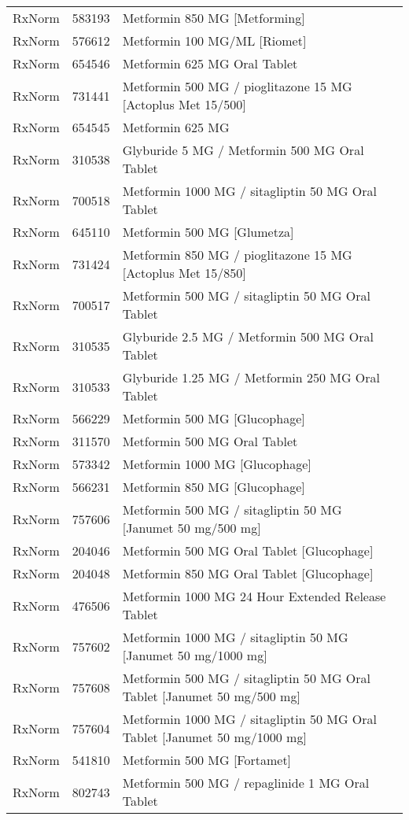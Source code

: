 \begin{longtable}{p{}p{}p{}}
  RxNorm & 583193 & Metformin 850 MG [Metforming] \\ 
  RxNorm & 576612 & Metformin 100 MG/ML [Riomet] \\ 
  RxNorm & 654546 & Metformin 625 MG Oral Tablet \\ 
  RxNorm & 731441 & Metformin 500 MG / pioglitazone 15 MG [Actoplus Met 15/500] \\ 
  RxNorm & 654545 & Metformin 625 MG \\ 
  RxNorm & 310538 & Glyburide 5 MG / Metformin 500 MG Oral Tablet \\ 
  RxNorm & 700518 & Metformin 1000 MG / sitagliptin 50 MG Oral Tablet \\ 
  RxNorm & 645110 & Metformin 500 MG [Glumetza] \\ 
  RxNorm & 731424 & Metformin 850 MG / pioglitazone 15 MG [Actoplus Met 15/850] \\ 
  RxNorm & 700517 & Metformin 500 MG / sitagliptin 50 MG Oral Tablet \\ 
  RxNorm & 310535 & Glyburide 2.5 MG / Metformin 500 MG Oral Tablet \\ 
  RxNorm & 310533 & Glyburide 1.25 MG / Metformin 250 MG Oral Tablet \\ 
  RxNorm & 566229 & Metformin 500 MG [Glucophage] \\ 
  RxNorm & 311570 & Metformin 500 MG Oral Tablet \\ 
  RxNorm & 573342 & Metformin 1000 MG [Glucophage] \\ 
  RxNorm & 566231 & Metformin 850 MG [Glucophage] \\ 
  RxNorm & 757606 & Metformin 500 MG / sitagliptin 50 MG [Janumet 50 mg/500 mg] \\ 
  RxNorm & 204046 & Metformin 500 MG Oral Tablet [Glucophage] \\ 
  RxNorm & 204048 & Metformin 850 MG Oral Tablet [Glucophage] \\ 
  RxNorm & 476506 & Metformin 1000 MG 24 Hour Extended Release Tablet \\ 
  RxNorm & 757602 & Metformin 1000 MG / sitagliptin 50 MG [Janumet 50 mg/1000 mg] \\ 
  RxNorm & 757608 & Metformin 500 MG / sitagliptin 50 MG Oral Tablet [Janumet 50 mg/500 mg] \\ 
  RxNorm & 757604 & Metformin 1000 MG / sitagliptin 50 MG Oral Tablet [Janumet 50 mg/1000 mg] \\ 
  RxNorm & 541810 & Metformin 500 MG [Fortamet] \\ 
  RxNorm & 802743 & Metformin 500 MG / repaglinide 1 MG Oral Tablet \\ 

\end{longtable}
